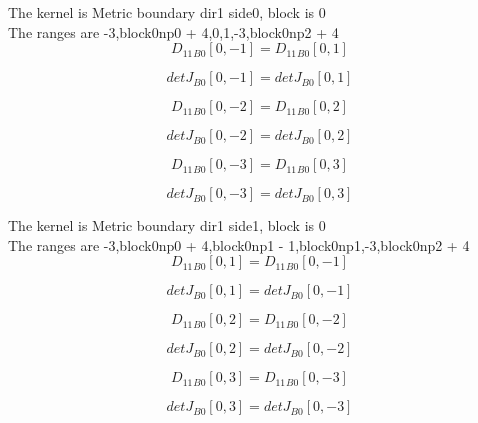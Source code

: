 \documentclass{article}
\begin{document}
\noindent The kernel is Metric boundary dir1 side0, block is 0\\\noindent The ranges are -3,block0np0 + 4,0,1,-3,block0np2 + 4\\\begin{dmath}{D_{11}{_{B0}}}[{0,-1}] = {D_{11}{_{B0}}}[{0,1}]\end{dmath}

\begin{dmath}{detJ{_{B0}}}[{0,-1}] = {detJ{_{B0}}}[{0,1}]\end{dmath}

\begin{dmath}{D_{11}{_{B0}}}[{0,-2}] = {D_{11}{_{B0}}}[{0,2}]\end{dmath}

\begin{dmath}{detJ{_{B0}}}[{0,-2}] = {detJ{_{B0}}}[{0,2}]\end{dmath}

\begin{dmath}{D_{11}{_{B0}}}[{0,-3}] = {D_{11}{_{B0}}}[{0,3}]\end{dmath}

\begin{dmath}{detJ{_{B0}}}[{0,-3}] = {detJ{_{B0}}}[{0,3}]\end{dmath}

\noindent The kernel is Metric boundary dir1 side1, block is 0\\\noindent The ranges are -3,block0np0 + 4,block0np1 - 1,block0np1,-3,block0np2 + 4\\\begin{dmath}{D_{11}{_{B0}}}[{0,1}] = {D_{11}{_{B0}}}[{0,-1}]\end{dmath}

\begin{dmath}{detJ{_{B0}}}[{0,1}] = {detJ{_{B0}}}[{0,-1}]\end{dmath}

\begin{dmath}{D_{11}{_{B0}}}[{0,2}] = {D_{11}{_{B0}}}[{0,-2}]\end{dmath}

\begin{dmath}{detJ{_{B0}}}[{0,2}] = {detJ{_{B0}}}[{0,-2}]\end{dmath}

\begin{dmath}{D_{11}{_{B0}}}[{0,3}] = {D_{11}{_{B0}}}[{0,-3}]\end{dmath}

\begin{dmath}{detJ{_{B0}}}[{0,3}] = {detJ{_{B0}}}[{0,-3}]\end{dmath}
\end{document}
